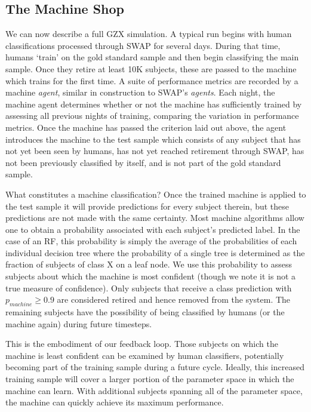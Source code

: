 \documentclass[twocolumn]{aastex6}
\begin{document}
\subsection{The Machine Shop}
We can now describe a full GZX simulation. A typical run begins with human classifications 
processed through SWAP for several days. During that time, humans `train' on the 
gold standard sample and then begin classifying the main sample.  Once they retire 
at least 10K subjects, these are passed to the machine which trains for the first time. 
A suite of performance metrics are recorded by a machine \textit{agent}, similar
in construction to SWAP's \textit{agents}. Each night, the machine agent determines 
whether or not the machine has sufficiently trained by assessing all previous nights of 
training, comparing the variation in performance metrics. Once the machine has
passed the criterion laid out above, the agent introduces the machine to the test sample
which consists of any subject that has not yet been seen by humans, has not yet 
reached retirement through SWAP, has not been previously classified by itself, 
and is not part of the gold standard sample.  

What constitutes a machine classification? Once the trained machine is applied to
the test sample it will provide predictions for every subject therein, but these predictions
are not made with the same certainty. Most machine algorithms allow one to obtain
a probability associated with each subject's predicted label. 
In the case of an RF, this probability is simply the average of the probabilities of each 
individual decision tree where the probability of a single tree is determined as the fraction
of subjects of class X on a leaf node.  We use this probability to assess subjects about which
the machine is most confident (though we note it is not a true measure of confidence).
Only subjects that receive a class prediction with $p_{machine} \ge 0.9$ are considered
retired and hence removed from the system. The remaining subjects have the possibility 
of being classified by humans (or the machine again) during future timesteps. 


This is the embodiment of our feedback loop. Those subjects on which the machine
is least confident can be examined by human classifiers, potentially becoming part of the
training sample during a future cycle. Ideally, this increased training sample will 
cover a larger portion of the parameter space in which the machine can learn. 
With additional subjects spanning all of the parameter space, 
the machine can quickly achieve its maximum performance. 
\end{document}
